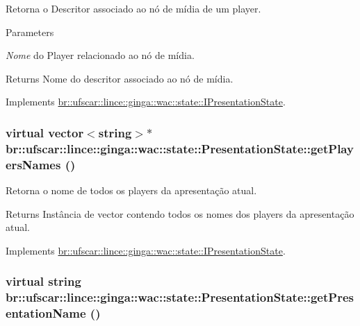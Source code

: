 Retorna o Descritor associado ao nó de mídia de um player. 


\begin{DoxyParams}{Parameters}
\item[{\em Nome}]do Player relacionado ao nó de mídia. \end{DoxyParams}
\begin{DoxyReturn}{Returns}
Nome do descritor associado ao nó de mídia. 
\end{DoxyReturn}


Implements \hyperlink{classbr_1_1ufscar_1_1lince_1_1ginga_1_1wac_1_1state_1_1IPresentationState_a4a8d2526ea16319ea1efc19928ffe028}{br::ufscar::lince::ginga::wac::state::IPresentationState}.

\hypertarget{classbr_1_1ufscar_1_1lince_1_1ginga_1_1wac_1_1state_1_1PresentationState_a82bc0879c2e2d6c6eb48ffaeee043bac}{
\subsubsection[{getPlayersNames}]{\setlength{\rightskip}{0pt plus 5cm}virtual vector$<$string$>$$\ast$ br::ufscar::lince::ginga::wac::state::PresentationState::getPlayersNames ()}}
\label{classbr_1_1ufscar_1_1lince_1_1ginga_1_1wac_1_1state_1_1PresentationState_a82bc0879c2e2d6c6eb48ffaeee043bac}


Retorna o nome de todos os players da apresentação atual. 

\begin{DoxyReturn}{Returns}
Instância de vector contendo todos os nomes dos players da apresentação atual. 
\end{DoxyReturn}


Implements \hyperlink{classbr_1_1ufscar_1_1lince_1_1ginga_1_1wac_1_1state_1_1IPresentationState_ac3ba6e82191af041b1bc4320ddaf0ca5}{br::ufscar::lince::ginga::wac::state::IPresentationState}.

\hypertarget{classbr_1_1ufscar_1_1lince_1_1ginga_1_1wac_1_1state_1_1PresentationState_af4149387468f9a7180c036f4fdce03bd}{
\subsubsection[{getPresentationName}]{\setlength{\rightskip}{0pt plus 5cm}virtual string br::ufscar::lince::ginga::wac::state::PresentationState::getPresentationName ()}}
\label{classbr_1_1ufscar_1_1lince_1_1ginga_1_1wac_1_1state_1_1PresentationState_af4149387468f9a7180c036f4fdce03bd}



